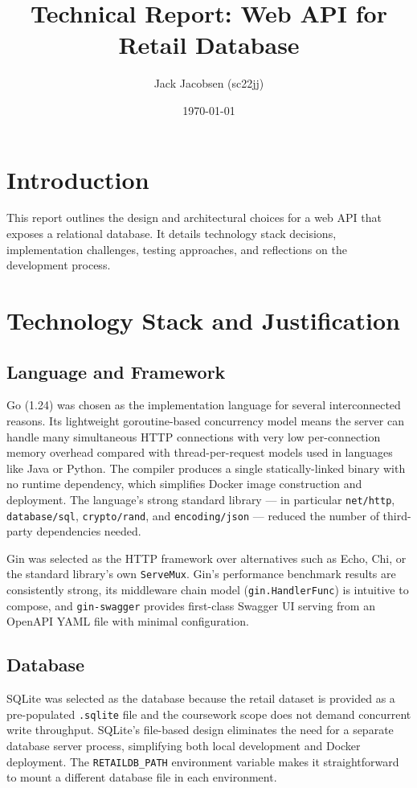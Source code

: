 \documentclass[8pt,a4paper]{article}
\title{Technical Report: Web API for Retail Database}
\author{Jack Jacobsen (sc22jj)}
\date{\today}
\begin{document}
\maketitle

\section{Introduction}
This report outlines the design and architectural choices for a web API that exposes a relational database. It details technology stack decisions, implementation challenges, testing approaches, and reflections on the development process.

\section{Technology Stack and Justification}

\subsection{Language and Framework}
Go (1.24) was chosen as the implementation language for several interconnected reasons. Its lightweight goroutine-based concurrency model means the server can handle many simultaneous HTTP connections with very low per-connection memory overhead compared with thread-per-request models used in languages like Java or Python. The compiler produces a single statically-linked binary with no runtime dependency, which simplifies Docker image construction and deployment. The language's strong standard library — in particular \texttt{net/http}, \texttt{database/sql}, \texttt{crypto/rand}, and \texttt{encoding/json} — reduced the number of third-party dependencies needed.

Gin was selected as the HTTP framework over alternatives such as Echo, Chi, or the standard library's own \texttt{ServeMux}. Gin's performance benchmark results are consistently strong, its middleware chain model (\texttt{gin.HandlerFunc}) is intuitive to compose, and \texttt{gin-swagger} provides first-class Swagger UI serving from an OpenAPI YAML file with minimal configuration.

\subsection{Database}
SQLite was selected as the database because the retail dataset is provided as a pre-populated \texttt{.sqlite} file and the coursework scope does not demand concurrent write throughput. SQLite's file-based design eliminates the need for a separate database server process, simplifying both local development and Docker deployment. The \texttt{RETAILDB\_PATH} environment variable makes it straightforward to mount a different database file in each environment.
\end{document}
